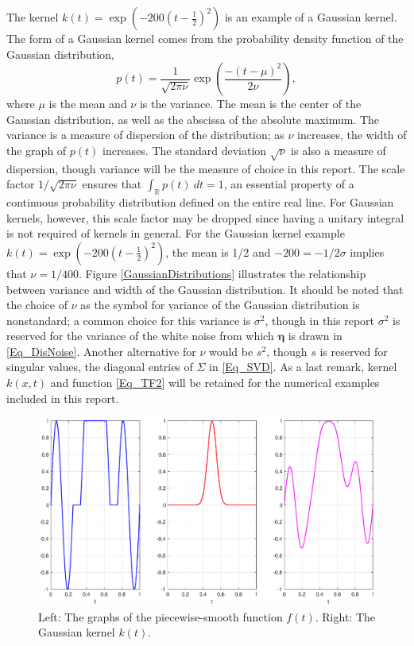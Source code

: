 \documentclass[12pt]{article}
\newcommand{\kcon}{k}
\newcommand{\fcon}{f}
\newcommand{\blurV}{\nu}	%
\newcommand{\noiseSD}{\sigma}	%
\newcommand{\noise}{\bm{\eta}}	%
\begin{document}
The kernel $\kcon(t) = \exp(-200(t-\frac{1}{2})^2)$ is an example of a Gaussian kernel. The form of a Gaussian kernel comes from the probability density function of the Gaussian distribution,
\[p(t) = \frac{1}{\sqrt{2\pi\blurV}}\exp\left(\frac{-(t-\mu)^2}{2\blurV}\right),\]
where $\mu$ is the mean and $\blurV$ is the variance. The mean is the center of the Gaussian distribution, as well as the abscissa of the absolute maximum. The variance is a measure of dispersion of the distribution; as $\blurV$ increases, the width of the graph of $p(t)$ increases. The standard deviation $\sqrt{\blurV}$ is also a measure of dispersion, though variance will be the measure of choice in this report. The scale factor $1/\sqrt{2\pi\blurV}$ ensures that $\int_{\mathbb{R}} p(t) \: dt = 1$, an essential property of a continuous probability distribution defined on the entire real line. For Gaussian kernels, however, this scale factor may be dropped since having a unitary integral is not required of kernels in general.  For the Gaussian kernel example $\kcon(t) = \exp(-200(t-\frac{1}{2})^2)$, the mean is 1/2 and $-200 = -1/2\noiseSD$ implies that $\blurV = 1/400$. Figure \ref{GaussianDistributions} illustrates the relationship between variance and width of the Gaussian distribution. It should be noted that the choice of $\blurV$ as the symbol for variance of the Gaussian distribution is nonstandard; a common choice for this variance is $\sigma^2$, though in this report $\sigma^2$ is reserved for the variance of the white noise from which $\noise$ is drawn in \eqref{Eq_DisNoise}. Another alternative for $\blurV$ would be $s^2$, though $s$ is reserved for singular values, the diagonal entries of $\Sigma$ in \eqref{Eq_SVD}. As a last remark, kernel $k(x,t)$ and function \eqref{Eq_TF2} will be retained for the numerical examples included in this report.

\begin{figure}
	\centerline{\includegraphics[scale=0.4]{Figures/FunctionKernelPlot.eps}}
\caption{Left: The graphs of the piecewise-smooth function $\fcon(t)$. Right: The Gaussian kernel $\kcon(t)$.}
\label{FunctionKernelPlot}
\end{figure}
\end{document}
